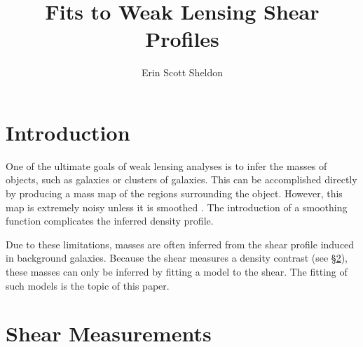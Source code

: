 \documentclass[preprint]{aastex}
\begin{document}
\title{Fits to Weak Lensing Shear Profiles}
\author{Erin Scott Sheldon}

\begin{abstract}
\end{abstract}

\keywords{}

\section{Introduction}

One of the ultimate goals of weak lensing analyses is to infer the masses of
objects, such as galaxies or clusters of galaxies. This can be accomplished
directly by producing a mass map of the regions surrounding the object.  
However, this map is extremely noisy unless it is smoothed \citep{KS93}.  The
introduction of a smoothing function complicates the inferred density profile.

Due to these limitations, masses are often inferred from the shear profile
induced in background galaxies.  Because the shear measures a density contrast
(see \S \ref{shearmeas}), these masses can only be inferred by fitting a 
model to the shear.  The fitting of such models is the topic of this paper.

\section{Shear Measurements} \label{shearmeas}
\end{document}

